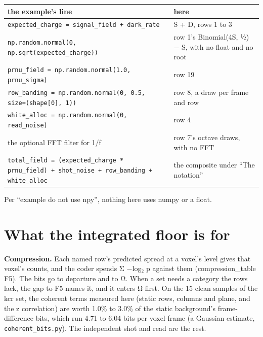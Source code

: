 {\small
\setlength{\tabcolsep}{6pt}
\begin{longtable}{>{\RaggedRight\arraybackslash}p{}>{\RaggedRight\arraybackslash}p{}}
\toprule
the example's line & here \\
\midrule
\endhead
\texttt{expected\_\allowbreak{}charge = signal\_\allowbreak{}field + dark\_\allowbreak{}rate} & S + D, rows 1 to 3 \\
\texttt{np.\allowbreak{}random.\allowbreak{}normal(0, np.\allowbreak{}sqrt(expected\_\allowbreak{}charge))} & row 1's Binomial(4S, ½) − S, with no float and no root \\
\texttt{prnu\_\allowbreak{}field = np.\allowbreak{}random.\allowbreak{}normal(1.\allowbreak{}0, prnu\_\allowbreak{}sigma)} & row 19 \\
\texttt{row\_\allowbreak{}banding = np.\allowbreak{}random.\allowbreak{}normal(0, 0.\allowbreak{}5, size=(shape[0], 1))} & row 8, a draw per frame and row \\
\texttt{white\_\allowbreak{}alloc = np.\allowbreak{}random.\allowbreak{}normal(0, read\_\allowbreak{}noise)} & row 4 \\
the optional FFT filter for 1/f & row 7's octave draws, with no FFT \\
\texttt{total\_\allowbreak{}field = (expected\_\allowbreak{}charge * prnu\_\allowbreak{}field) + shot\_\allowbreak{}noise + row\_\allowbreak{}banding + white\_\allowbreak{}alloc} & the composite under “The notation” \\
\bottomrule
\end{longtable}
}

Per “example do not use npy”, nothing here uses numpy or a float.

\section{\texorpdfstring{What the integrated floor is for}{What the integrated floor is for}}

\textbf{Compression.} Each named row's predicted spread at a voxel's level gives that voxel's counts, and the coder spends Σ −log₂ p against them (compression\_\allowbreak{}table F5). The bits go to departure and to Ω. When a set needs a category the rows lack, the gap to F5 names it, and it enters Ω first. On the 15 clean samples of the kcr set, the coherent terms measured here (static rows, columns and plane, and the z correlation) are worth 1.0\% to 3.0\% of the static background's frame-difference bits, which run 4.71 to 6.04 bits per voxel-frame (a Gaussian estimate, \texttt{coherent\_\allowbreak{}bits.\allowbreak{}py}). The independent shot and read are the rest.

